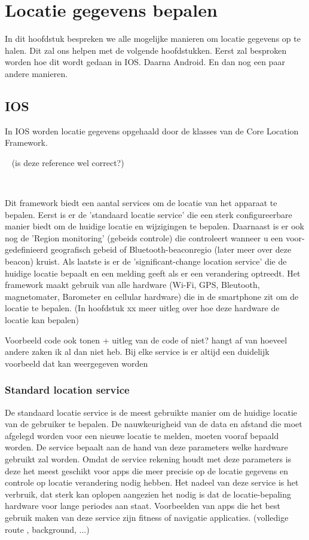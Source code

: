 \chapter{Locatie gegevens bepalen}
\label{ch:locatiegegevensbepalen}
In dit hoofdstuk bespreken we alle mogelijke manieren om locatie gegevens op te halen.
Dit zal ons helpen met de volgende hoofdstukken. 
Eerst zal besproken worden hoe dit wordt gedaan in IOS.
Daarna Android.
En dan nog een paar andere manieren.

\section{IOS}
\label{sec: ios}
In IOS worden locatie gegevens opgehaald door de klasses van de Core Location Framework.

~\textcite{IosLocFramework} (is deze reference wel correct?)

~\autocite{IosLocFramework}

Dit framework biedt een aantal services om de locatie van het apparaat te bepalen.
Eerst is er de 'standaard locatie service' die een sterk configureerbare manier biedt om de huidige locatie en wijzigingen te bepalen. Daarnaast is er ook nog de 'Region monitoring' (gebeids controle) die controleert wanneer u een  voor-gedefinieerd geografisch gebeid of Bluetooth-beaconregio (later meer over deze beacon) kruist. Als laatste is er de 'significant-change location service' die de huidige locatie bepaalt en een melding geeft als er een verandering optreedt. Het framework maakt gebruik van alle hardware (Wi-Fi, GPS, Bleutooth, magnetomater, Barometer en cellular hardware) die in de smartphone zit om de locatie te bepalen. (In hoofdstuk xx meer uitleg over hoe deze hardware de locatie kan bepalen)

Voorbeeld code ook tonen + uitleg van de code of niet? hangt af van hoeveel andere zaken ik al dan niet heb.
Bij elke service is er altijd een duidelijk voorbeeld dat kan weergegeven worden

\subsection{Standard location service}
\label{subsec: standaardlocService}

De standaard locatie service is de meest gebruikte manier om de huidige locatie van de gebruiker te bepalen. De nauwkeurigheid van de data en afstand die moet afgelegd worden voor een nieuwe locatie te melden, moeten vooraf bepaald worden. De service bepaalt aan de hand van deze parameters welke hardware gebruikt zal worden. Omdat de service rekening houdt met deze parameters is deze het meest geschikt voor apps die meer precisie op de locatie gegevens en controle op locatie verandering nodig hebben. Het nadeel van deze service is het verbruik, dat sterk kan oplopen aangezien het nodig is dat de locatie-bepaling hardware voor lange periodes aan staat. Voorbeelden van apps die het best gebruik maken van deze service zijn fitness of navigatie applicaties. (volledige route ,  background, ...)

